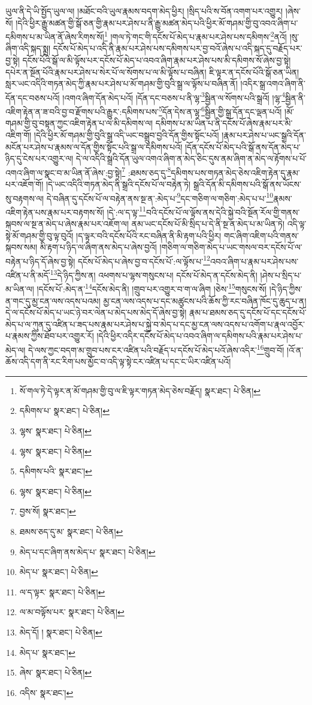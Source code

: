 ཡུལ་ནི་དེ་ཡི་སྤྱོད་ཡུལ་ལ། །མཐོང་བའི་ཡུལ་རྣམས་བདག་མེད་ཕྱིར། །སྲིད་པའི་ས་བོན་འགག་པར་འགྱུར། །ཞེས་སོ། །དེའི་ཕྱིར་རྒྱུ་མཚན་གྱི་སྒོ་ཅན་གྱི་རྣམ་པར་ཤེས་པ་ནི་རྒྱུ་མཚན་མེད་པའི་ཕྱིར་མོ་གཤམ་གྱི་བུ་འབའ་ཞིག་པ་དམིགས་པ་མ་ཡིན་ནོ་ཞེས་རིགས་སོ།\footnote{སོ་གལ་ཏེ་དེ་ལྟར་ན་མོ་གཤམ་གྱི་བུ་ལ་ཇི་ལྟར་གཏན་མེད་ཅེས་བརྗོད།  སྣར་ཐང་།  པེ་ཅིན། } །གལ་ཏེ་གང་གི་དངོས་པོ་མེད་པ་རྣམ་པར་ཤེས་པས་དམིགས་\footnote{དམིགས་པ་  སྣར་ཐང་།  པེ་ཅིན། }ནའོ། །སུ་ཞིག་འདི་སྐད་སྨྲ། དངོས་པོ་མེད་པ་འདི་ནི་རྣམ་པར་ཤེས་པས་དམིགས་པར་བྱ་བའོ་ཞེས་པ་འདི་སྐད་དུ་བརྗོད་པར་བྱ་སྟེ། དངོས་པོའི་སྒོ་ལ་མི་ལྟོས་པར་དངོས་པོ་མེད་པ་འབའ་ཞིག་རྣམ་པར་ཤེས་པས་མི་དམིགས་སོ་ཞེས་བྱ་སྟེ། དཔེར་ན་སྔོན་པོའི་རྣམ་པར་ཤེས་པ་སེར་པོ་ལ་སོགས་པ་ལ་མི་ལྟོས་པ་བཞིན། ཇི་ལྟར་ན་དངོས་པོའི་སྒོ་ཅན་ཡིན། སླར་ཡང་འདིའི་གཏན་མེད་ཀྱི་རྣམ་པར་ཤེས་པ་མོ་གཤམ་གྱི་བུའི་སྒྲ་ལ་ལྟོས་པ་བཞིན་ནོ། །འདིར་སྒྲ་འགའ་ཞིག་ནི་དོན་དང་བཅས་པའོ། །འགའ་ཞིག་དོན་མེད་པའོ། །དོན་དང་བཅས་པ་ནི་ལྷ་\footnote{ལྷས་  སྣར་ཐང་།  པེ་ཅིན། }སྦྱིན་ལ་སོགས་པའི་སྒྲའོ། །ལྷ་\footnote{ལྷས་  སྣར་ཐང་།  པེ་ཅིན། }སྦྱིན་ནི་འཇིག་རྟེན་ན་ཟ་བའི་བྱ་བ་རྫོགས་པའི་རྒྱུར་:དམིགས་པས་\footnote{དམིགས་པའི་  སྣར་ཐང་། }དོན་དེས་ན་ལྷ་\footnote{ལྷས་  སྣར་ཐང་།  པེ་ཅིན། }སྦྱིན་གྱི་སྒྲ་དོན་དང་ལྡན་པའོ། །མོ་གཤམ་གྱི་བུ་བསྟན་ཀྱང་འཇིག་རྟེན་པ་ལ་མི་དམིགས་ལ། དམིགས་པ་མ་ཡིན་པ་ནི་དངོས་པོ་ཞེས་རྣམ་པར་མི་འཇིག་གོ། །དེའི་ཕྱིར་མོ་གཤམ་གྱི་བུའི་སྒྲ་འདི་ཡང་བསྒྲུབ་བྱའི་དོན་གྱིས་སྟོང་པའོ། །རྣམ་པར་ཤེས་པ་ཡང་སྒྲའི་དོན་མངོན་པར་ཤེས་པ་རྣམས་ལ་དོན་གྱིས་སྟོང་པའི་སྒྲ་ལ་དམིགས་པའོ། །དོན་དངོས་པོ་མེད་པའི་སྒོ་ནས་དོན་མེད་པ་ཉིད་དུ་ངེས་པར་འགྱུར་ལ། དེ་ལ་འདིའི་སྒྲའི་དོན་ཡུལ་འགའ་ཞིག་ན་མེད་ཅིང་དུས་ནམ་ཞིག་ན་མེད་ལ་རྟོགས་པ་པོ་འགའ་ཞིག་ལ་སྣང་བ་མ་ཡིན་ནོ་ཞེས་:བྱ་སྟེ།\footnote{བྱས་སོ།  སྣར་ཐང་། } :ཐམས་ཅད་དུ་\footnote{ཐམས་ཅད་དུ་མ་  སྣར་ཐང་།  པེ་ཅིན། }དམིགས་པས་གཏན་མེད་ཅེས་འཇིག་རྟེན་དུ་རྣམ་པར་འཇོག་གོ། །དེ་ཡང་འདིའི་གཏན་མེད་ནི་སྒྲའི་དངོས་པོ་ལ་བརྟེན་ཏེ། སྒྲའི་དོན་མི་དམིགས་པའི་སྒོ་ནས་ཡོངས་སུ་བརྟགས་ལ། དེ་བཞིན་དུ་དངོས་པོ་ལ་བརྟེན་ནས་སྔ་ན་:མེད་པ་\footnote{མེད་པ་དང་ཞིག་ནས་མེད་པ་  སྣར་ཐང་།  པེ་ཅིན། }དང་གཅིག་ལ་གཅིག་:མེད་པ་པ་\footnote{མེད་པ་  སྣར་ཐང་།  པེ་ཅིན། }རྣམས་འཇིག་རྟེན་པས་རྣམ་པར་བརྟགས་སོ། །དེ་:ལ་ད་ལྟ་\footnote{ལ་ད་ལྟར་  སྣར་ཐང་།  པེ་ཅིན། }བའི་དངོས་པོ་ལ་ལྟོས་ནས་དེའི་སྐྱེ་བའི་སྔོན་རོལ་གྱི་གནས་སྐབས་ལ་སྔ་ན་མེད་པ་ཞེས་རྣམ་པར་འཇོག་ལ། ནམ་ཡང་དངོས་པོ་མི་སྲིད་པ་དེ་ནི་སྔ་ན་མེད་པ་མ་ཡིན་ཏེ། འདི་ལྟ་སྟེ་མོ་གཤམ་གྱི་བུ་ལྟ་བུའོ། །ད་ལྟར་བའི་དངོས་པོའི་རང་བཞིན་ནི་མི་རྟག་པའི་ཕྱིར། གང་ཞིག་འཇིག་པའི་གནས་སྐབས་སམ། མི་རྟག་པ་ཉིད་ལ་ཞིག་ནས་མེད་པ་ཞེས་བྱའོ། །གཅིག་ལ་གཅིག་མེད་པ་ཡང་གསལ་བར་དངོས་པོ་ལ་བརྟེན་པ་ཉིད་དོ་ཞེས་བྱ་སྟེ། དངོས་པོ་མེད་པ་ཞེས་བྱ་བ་དངོས་པོ་:ལ་ལྟོས་པ་\footnote{ལ་མ་བལྟོས་པར་  སྣར་ཐང་།  པེ་ཅིན། }འབའ་ཞིག་པ་རྣམ་པར་ཤེས་པས་འཛིན་པ་ནི་མདོ་\footnote{མེད་དོ། །  སྣར་ཐང་།  པེ་ཅིན། }དེ་ཉིད་ཀྱིས་ན། འཕགས་པ་ལྷས་གསུངས་པ། དངོས་པོ་མེད་ན་དངོས་མེད་ནི། །ཤེས་པ་སྲིད་པ་མ་ཡིན་ལ། །དངོས་པོ་:མེད་ན་\footnote{མེད་པ་  སྣར་ཐང་། }དངོས་མེད་ནི། །གྲུབ་པར་འགྱུར་བ་ག་ལ་ཞིག །ཅེས་\footnote{ཞེས་  སྣར་ཐང་།  པེ་ཅིན། }གསུངས་སོ། །དེ་ཉིད་ཀྱིས་ན་གང་དུ་མྱ་ངན་ལས་འདས་པའམ། མྱ་ངན་ལས་འདས་པ་དང་མཚུངས་པའི་ཆོས་ཀྱི་རང་བཞིན་ཁོང་དུ་ཆུད་པ་ན། དེ་ལ་དངོས་པོ་མེད་པ་ཡང་ཉེ་བར་ལེན་པ་མེད་པས་མེད་དོ་ཞེས་བྱ་སྟེ། རྣམ་པ་ཐམས་ཅད་དུ་དངོས་པོ་དང་དངོས་པོ་མེད་པ་ལ་ཀུན་དུ་འཛིན་པ་ཟད་པས་རྣམ་པར་ཤེས་པ་སྐྱེ་བ་མེད་པ་དང་མྱ་ངན་ལས་འདས་པ་འགོག་པ་རྣལ་འབྱོར་པ་རྣམས་ཀྱིས་ཐོབ་པར་འགྱུར་རོ། །དེའི་ཕྱིར་འདིར་དངོས་པོ་མེད་པ་འབའ་ཞིག་ལ་དམིགས་པའི་རྣམ་པར་ཤེས་པ་མེད་ལ། དེ་ལས་ཀྱང་བདག་མ་གྲུབ་པས་ངར་འཛིན་པའི་བརྗོད་པ་དངོས་པོ་མེད་པའོ་ཞེས་འདིར་\footnote{འདིས་  སྣར་ཐང་། }གྲུབ་བོ། །འོ་ན་ཆོས་འདི་དག་ནི་རང་རིག་པས་མྱོང་བ་འདི་ལྟ་སྟེ་ངར་འཛིན་པ་དང་ང་ཡིར་འཛིན་པའོ། 